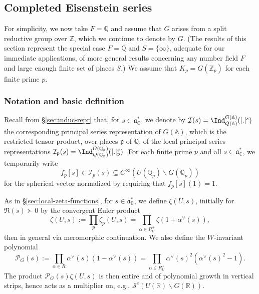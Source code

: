 \subsection{Completed Eisenstein series}\label{sec:compl-eisenst-seri}
For simplicity, we now take $F = \mathbb{Q}$ and assume that $G$ arises from a split reductive group over $\mathbb{Z}$, which we continue to denote by $G$.  (The results of this section represent the special case $F = \mathbb{Q}$ and $S = \{\infty\}$, adequate for our immediate applications, of more general results concerning any number field $F$ and large enough finite set of places $S$.)  We assume that $K_p = G(\mathbb{Z}_p)$ for each finite prime $p$.

\subsubsection{Notation and basic definition}\label{sec:notat-basic-defin}
Recall from \S\ref{sec:induc-repr} that, for $s \in \mathfrak{a}_{\mathbb{C}}^*$, we denote by $\mathcal{I}(s) = \Ind_{Q(\mathbb{A})}^{G(\mathbb{A})} (|.|^s)$ the corresponding principal series representation of $G(\mathbb{A})$, which is the restricted tensor product, over places $\mathfrak{p}$ of $\mathbb{Q}$, of the local principal series representations $\mathcal{I}_\mathfrak{p}(s) = \Ind_{Q(\mathbb{Q}_\mathfrak{p})}^{G(\mathbb{Q}_\mathfrak{p})}(|.|_{\mathfrak{p}}^s)$.  For each finite prime $p$ and all $s \in \mathfrak{a}_{\mathbb{C}}^*$, we temporarily write
\begin{equation}\label{eq:holomorphic-families-f-p-of-s}
  f_p[s] \in \mathcal{I}_p(s) \subseteq C^\infty(U(\mathbb{Q}_p) \backslash G(\mathbb{Q}_p))
\end{equation}
for the spherical vector normalized by requiring that $f_p[s](1) = 1$.

As in \S\ref{sec:local-zeta-functions}, for $s \in \mathfrak{a}_{\mathbb{C}}^*$, we define $\zeta(U,s)$, initially for $\Re(s) \succ 0$ by the convergent Euler product 
\begin{equation}\label{eq:zeta-U-s-global-over-Z}
  \zeta(U,s) :=
  \prod_p
  \zeta_p(U,s)
  =
  \prod_{\alpha \in R_U^+}
  \zeta(1 + \alpha^\vee(s)),
\end{equation}
then in general via meromorphic continuation.  We also define the $W$-invariant polynomial 
\begin{equation*}
  \mathcal{P}_G(s)
  :=
  \prod_{\alpha \in R}
  \alpha^\vee(s)
  (1 - \alpha^\vee(s))
  =
  \prod_{\alpha \in R_U^+}
  \alpha^\vee(s)^2
  (\alpha^\vee(s)^2 - 1).
\end{equation*}
The product $\mathcal{P}_G(s) \zeta(U,s)$ is then entire and of polynomial growth in vertical strips, hence acts as a multiplier on, e.g., $\mathcal{S}^e(U(\mathbb{R}) \backslash G(\mathbb{R}))$.

